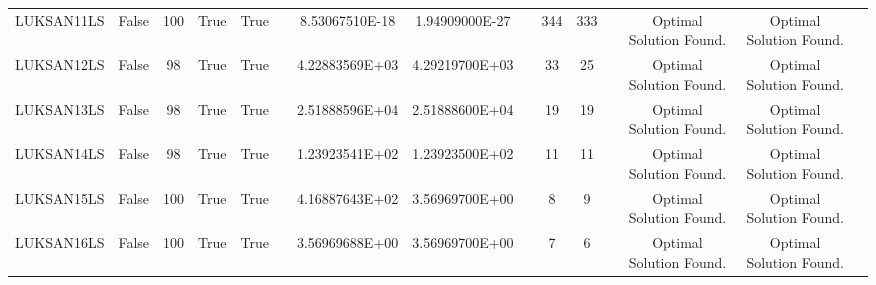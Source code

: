 \begin{longtable}{ccccccccccccccc}
	\cellcolor{default2} LUKSAN11LS& \cellcolor{default2} False& \cellcolor{default2} 100& \cellcolor{default2} True& \cellcolor{default2} True& \cellcolor{header} & \cellcolor{ok} 8.53067510E-18& \cellcolor{best} 1.94909000E-27& \cellcolor{header} & \cellcolor{ok} 344& \cellcolor{best} 333& \cellcolor{header} & \cellcolor{default2} Optimal Solution Found.& \cellcolor{default2} Optimal Solution Found.& \cellcolor{header} \\
	\cellcolor{default1} LUKSAN12LS& \cellcolor{default1} False& \cellcolor{default1} 98& \cellcolor{default1} True& \cellcolor{default1} True& \cellcolor{header} & \cellcolor{best} 4.22883569E+03& \cellcolor{poor} 4.29219700E+03& \cellcolor{header} & \cellcolor{ok} 33& \cellcolor{best} 25& \cellcolor{header} & \cellcolor{default1} Optimal Solution Found.& \cellcolor{default1} Optimal Solution Found.& \cellcolor{header} \\
	\cellcolor{default2} LUKSAN13LS& \cellcolor{default2} False& \cellcolor{default2} 98& \cellcolor{default2} True& \cellcolor{default2} True& \cellcolor{header} & \cellcolor{best} 2.51888596E+04& \cellcolor{ok} 2.51888600E+04& \cellcolor{header} & \cellcolor{best} 19& \cellcolor{best} 19& \cellcolor{header} & \cellcolor{default2} Optimal Solution Found.& \cellcolor{default2} Optimal Solution Found.& \cellcolor{header} \\
	\cellcolor{default1} LUKSAN14LS& \cellcolor{default1} False& \cellcolor{default1} 98& \cellcolor{default1} True& \cellcolor{default1} True& \cellcolor{header} & \cellcolor{ok} 1.23923541E+02& \cellcolor{best} 1.23923500E+02& \cellcolor{header} & \cellcolor{best} 11& \cellcolor{best} 11& \cellcolor{header} & \cellcolor{default1} Optimal Solution Found.& \cellcolor{default1} Optimal Solution Found.& \cellcolor{header} \\
	\cellcolor{default2} LUKSAN15LS& \cellcolor{default2} False& \cellcolor{default2} 100& \cellcolor{default2} True& \cellcolor{default2} True& \cellcolor{header} & \cellcolor{poor} 4.16887643E+02& \cellcolor{best} 3.56969700E+00& \cellcolor{header} & \cellcolor{best} 8& \cellcolor{ok} 9& \cellcolor{header} & \cellcolor{default2} Optimal Solution Found.& \cellcolor{default2} Optimal Solution Found.& \cellcolor{header} \\
	\cellcolor{default1} LUKSAN16LS& \cellcolor{default1} False& \cellcolor{default1} 100& \cellcolor{default1} True& \cellcolor{default1} True& \cellcolor{header} & \cellcolor{best} 3.56969688E+00& \cellcolor{ok} 3.56969700E+00& \cellcolor{header} & \cellcolor{ok} 7& \cellcolor{best} 6& \cellcolor{header} & \cellcolor{default1} Optimal Solution Found.& \cellcolor{default1} Optimal Solution Found.& \cellcolor{header} \\

\end{longtable}
